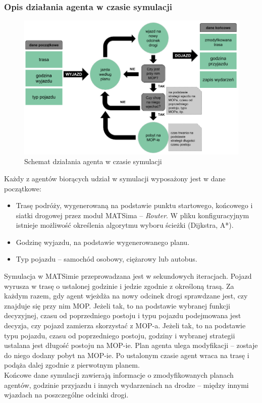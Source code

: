 \subsubsection{Opis działania agenta w czasie symulacji}
    \begin{figure}[h]
        \caption{Schemat działania agenta w czasie symulacji}
        \includegraphics[width=\textwidth]{images/mopsim/agent-dzialanie.png}
    \end{figure}
Każdy z agentów biorących udział w symulacji wyposażony jest w dane początkowe:
\begin{itemize}
\item Trasę podróży, wygenerowaną na podstawie punktu startowego, końcowego i siatki drogowej przez moduł MATSima -- \textit{Router}. W pliku konfiguracyjnym istnieje możliwość określenia algorytmu wyboru ścieżki (Dijkstra, A*).
\item Godzinę wyjazdu, na podstawie wygenerowanego planu.
\item Typ pojazdu -- samochód osobowy, ciężarowy lub autobus.
\end{itemize}
Symulacja w MATSimie przeprowadzana jest w sekundowych iteracjach. Pojazd wyrusza w trasę o ustalonej godzinie i jedzie zgodnie z określoną trasą. Za każdym razem, gdy agent wjeżdża na nowy odcinek drogi sprawdzane jest, czy znajduje się przy nim MOP. Jeżeli tak, to na podstawie wybranej funkcji decyzyjnej, czasu od poprzedniego postoju i typu pojazdu podejmowana jest decyzja, czy pojazd zamierza skorzystać z MOP-a. Jeżeli tak, to na podstawie typu pojazdu, czasu od poprzedniego postoju, godziny i wybranej strategii ustalana jest długość postoju na MOP-ie. Plan agenta ulega modyfikacji -- zostaje do niego dodany pobyt na MOP-ie. Po ustalonym czasie agent wraca na trasę i podąża dalej zgodnie z pierwotnym planem. \\
Końcowe dane symulacji zawierają informacje o zmodyfikowanych planach agentów, godzinie przyjazdu i innych wydarzeniach na drodze -- między innymi wjazdach na poszczególne odcinki drogi.

